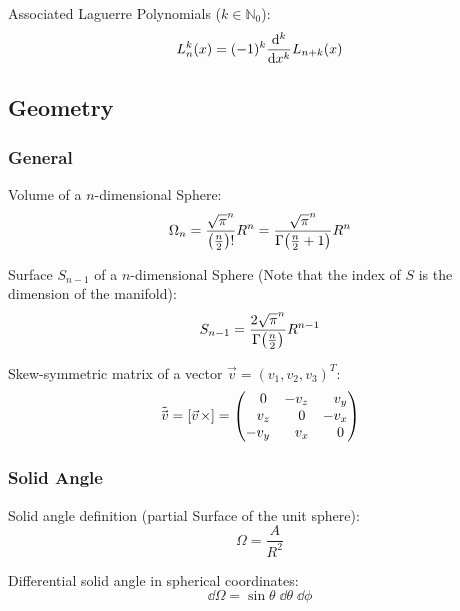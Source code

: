 			\noindent
			Associated Laguerre Polynomials ($k\in\mathbb{N}_0$):
			\begin{equation}
				L_n^k(x) = (-1)^k\dv[k]{x} L_{n+k}(x)
			\end{equation}

	\subsection{Geometry}
		\subsubsection{General}
			\noindent
			Volume of a $n$-dimensional Sphere:
			\begin{equation}
				\Omega_n = \frac{\sqrt{\pi}^n}{\qty(\frac{n}{2})!}R^n
				= \frac{\sqrt{\pi}^n}{\Gamma\qty(\frac{n}{2}+1)}R^n
			\end{equation}

			\noindent
			Surface $S_{n-1}$ of a $n$-dimensional Sphere (Note that the index of $S$ is the dimension of the manifold):
			\begin{equation}
				S_{n-1} = \frac{2\sqrt{\pi}^n}{\Gamma\qty(\frac{n}{2})}R^{n-1}
			\end{equation}

			\noindent
			Skew-symmetric matrix of a vector $\vec{v} = (v_1, v_2, v_3)^T$:
			\begin{equation}
				\tilde{\vec{v}} = \qty[\vec{v}\times] =
				\qty( \begin{matrix}
					\M 0   & -v_z   & \M v_y \\
					\M v_z & \M 0   & - v_x \\
					-v_y   & \M v_x & \M 0 \\
				\end{matrix} ) \\
			\end{equation}

		\subsubsection{Solid Angle}
			\noindent
			Solid angle definition (partial Surface of the unit sphere):
			\begin{equation}
				\Omega = \frac{A}{R^2}
			\end{equation}

			\noindent
			Differential solid angle in spherical coordinates:
			\begin{equation}
				\dd \Omega = \sin\theta\;\dd \theta \;\dd \phi
			\end{equation}


